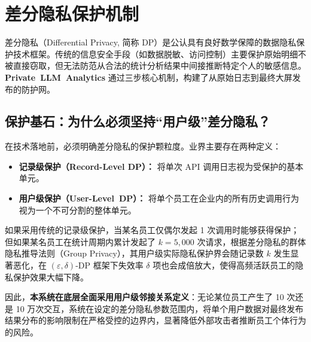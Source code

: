 \section{差分隐私保护机制}
\label{sec:dp_mechanism}

差分隐私（Differential Privacy, 简称 DP）是公认具有良好数学保障的数据隐私保护技术框架。传统的信息安全手段（如数据脱敏、访问控制）主要保护原始明细不被直接窃取，但无法防范从合法的统计分析结果中间接推断特定个人的敏感信息。\textbf{\mbox{Private LLM Analytics}} 通过三步核心机制，构建了从原始日志到最终大屏发布的防护网。

\subsection{保护基石：为什么必须坚持“用户级”差分隐私？}
在技术落地前，必须明确差分隐私的保护颗粒度。业界主要存在两种定义：
\begin{itemize}[leftmargin=2em]
  \item \textbf{记录级保护（Record-Level DP）：} 将单次 API 调用日志视为受保护的基本单元。
  \item \textbf{用户级保护（\mbox{User-Level DP}）：} 将单个员工在企业内的所有历史调用行为视为一个不可分割的整体单元。
\end{itemize}

如果采用传统的记录级保护，当某名员工仅偶尔发起 1 次调用时能够获得保护；但如果某名员工在统计周期内累计发起了 $k=5,000$ 次请求，根据差分隐私的群体隐私推导法则（Group Privacy），其用户级实际隐私保护界会随记录数 $k$ 发生显著恶化，在 $(\varepsilon, \delta)$-DP 框架下失效率 $\delta$ 项也会成倍放大，使得高频活跃员工的隐私保护效果大幅下降。

因此，\textbf{本系统在底层全面采用用户级邻接关系定义}：无论某位员工产生了 10 次还是 10 万次交互，系统在设定的差分隐私参数范围内，将单个用户数据对最终发布结果分布的影响限制在严格受控的边界内，显著降低外部攻击者推断员工个体行为的风险。

